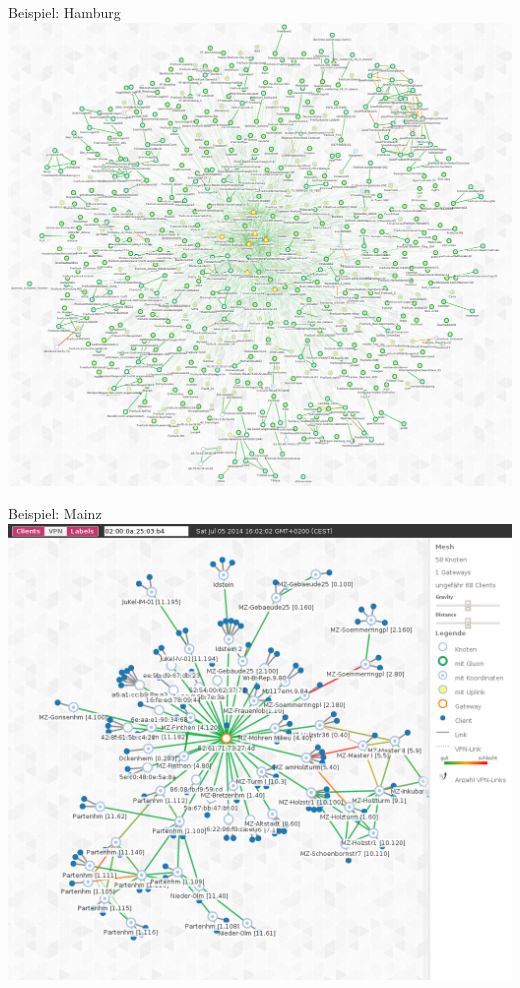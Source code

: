 \documentclass{beamer}
\begin{document}
\begin{frame}{Beispiel: Hamburg}
\vfill
\centering
\includegraphics[scale=0.22]{images/hamburg-graph}
\vfill
\end{frame}

\begin{frame}{Beispiel: Mainz}
\vfill
\centering
\includegraphics[scale=0.23]{images/mainz-nw}
\vfill
\end{frame}
\end{document}
